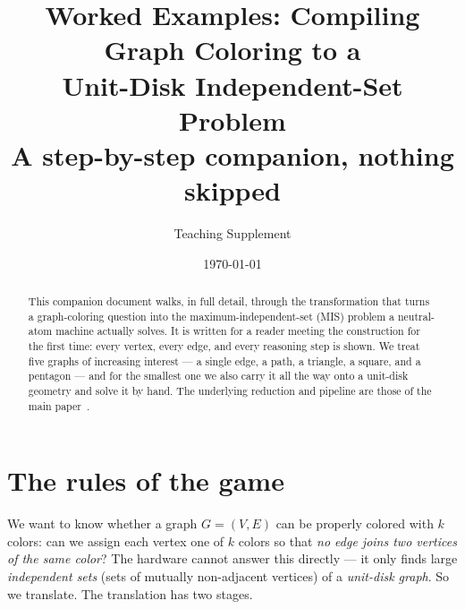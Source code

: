 \documentclass[11pt]{article}
\title{\textbf{Worked Examples: Compiling Graph Coloring to a\\ Unit-Disk Independent-Set Problem}\\[0.4em]
\large A step-by-step companion, nothing skipped}
\author{Teaching Supplement}
\date{\today}
\begin{document}
\maketitle

\begin{abstract}
This companion document walks, in full detail, through the transformation that
turns a graph-coloring question into the maximum-independent-set (MIS) problem a
neutral-atom machine actually solves. It is written for a reader meeting the
construction for the first time: every vertex, every edge, and every reasoning
step is shown. We treat five graphs of increasing interest --- a single edge, a
path, a triangle, a square, and a pentagon --- and for the smallest one we also
carry it all the way onto a unit-disk geometry and solve it by hand. The
underlying reduction and pipeline are those of the main
paper~\cite{Karp1972,Pichler2018,Nguyen2023}.
\end{abstract}

\tableofcontents

\section{The rules of the game}

We want to know whether a graph $G=(V,E)$ can be properly colored with $k$ colors:
can we assign each vertex one of $k$ colors so that \emph{no edge joins two
vertices of the same color}? The hardware cannot answer this directly --- it only
finds large \emph{independent sets} (sets of mutually non-adjacent vertices) of a
\emph{unit-disk graph}. So we translate. The translation has two stages.
\end{document}
